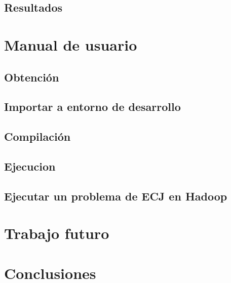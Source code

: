 \documentclass{estilos-y-libreria}
\begin{document}
	\section{Resultados}
		

\chapter{Manual de usuario}\label{manual-usuario}
	\section{Obtenci\'on}
		
	\section{Importar a entorno de desarrollo}
		
	\section{Compilaci\'on}
		
	\section{Ejecucion}\label{ejecucion}
		
	\section{Ejecutar un problema de ECJ en Hadoop}
		

\chapter{Trabajo futuro}\label{trabajo-futuro}
	
	
\chapter{Conclusiones}\label{conclusiones}
	

\end{document}
